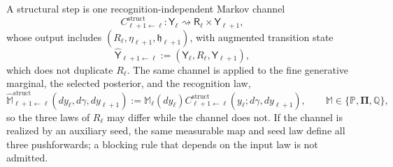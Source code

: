 A structural step is one recognition-independent Markov channel
\begin{equation}
C^{\mathrm{struct}}_{\ell+1\leftarrow\ell}:
\mathsf Y_\ell\rightsquigarrow\mathsf R_\ell\times\mathsf Y_{\ell+1},
\label{eq:full-graph-common-structural-channel}
\end{equation}
whose output includes $(R_\ell,\eta_{\ell+1},\mathfrak h_{\ell+1})$, with augmented
transition state
\begin{equation}
\widehat{\mathsf Y}_{\ell+1\leftarrow\ell}
:=(\mathsf Y_\ell,R_\ell,\mathsf Y_{\ell+1}),
\label{eq:full-graph-augmented-transition-state}
\end{equation}
which does not duplicate $R_\ell$. The same channel is applied to the fine generative
marginal, the selected posterior, and the recognition law,
\begin{equation}
\widehat{\mathbb M}^{\mathrm{struct}}_{\ell+1\leftarrow\ell}(dy_\ell,d\gamma,dy_{\ell+1})
:=\mathbb M_\ell(dy_\ell)C^{\mathrm{struct}}_{\ell+1\leftarrow\ell}(y_\ell;d\gamma,dy_{\ell+1}),
\qquad
\mathbb M\in\{\mathbb P,\boldsymbol\Pi,\mathbb Q\},
\label{eq:full-graph-common-structural-pushforwards}
\end{equation}
so the three laws of $R_\ell$ may differ while the channel does not. If the channel is
realized by an auxiliary seed, the same measurable map and seed law define all three
pushforwards; a blocking rule that depends on the input law is not admitted.

